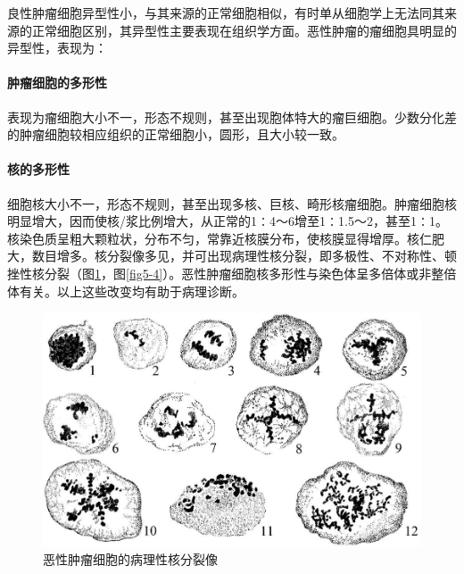 良性肿瘤细胞异型性小，与其来源的正常细胞相似，有时单从细胞学上无法同其来源的正常细胞区别，其异型性主要表现在组织学方面。恶性肿瘤的瘤细胞具明显的异型性，表现为：

\paragraph{肿瘤细胞的多形性}
表现为瘤细胞大小不一，形态不规则，甚至出现胞体特大的瘤巨细胞。少数分化差的肿瘤细胞较相应组织的正常细胞小，圆形，且大小较一致。

\paragraph{核的多形性}
细胞核大小不一，形态不规则，甚至出现多核、巨核、畸形核瘤细胞。肿瘤细胞核明显增大，因而使核/浆比例增大，从正常的1∶4～6增至1∶1.5～2，甚至1∶1。核染色质呈粗大颗粒状，分布不匀，常靠近核膜分布，使核膜显得增厚。核仁肥大，数目增多。核分裂像多见，并可出现病理性核分裂，即多极性、不对称性、顿挫性核分裂（图\ref{fig5-3}，图\ref{fig5-4}）。恶性肿瘤细胞核多形性与染色体呈多倍体或非整倍体有关。以上这些改变均有助于病理诊断。

\begin{figure}[!htbp]
  \centering
  \includegraphics{./images/Image00070.jpg}
  \caption{恶性肿瘤细胞的病理性核分裂像}
  \label{fig5-3}
\end{figure}

